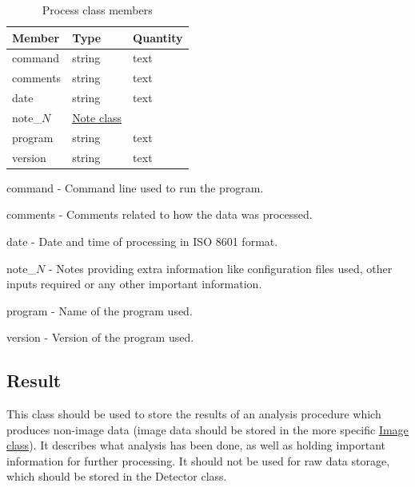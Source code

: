 \documentclass[usletter,11pt]{article}
\newcommand{\member}[2]
{ \noindent
{ \color{softBlue}  #1 - } #2
\vspace{0.2cm}
}
\begin{document}
\begin{table}[h!]\sffamily \footnotesize
\caption{Process class members}

\begin{tabular}{p{4.5cm} p{4.5cm}  p{2.5cm} }
\toprule
\bfseries Member     & \bfseries Type & \bfseries Quantity \\
\midrule
command & string & text \\
comments & string & text \\
date & string & text \\
note\_$N$ &  \hyperref[table:note]{Note class} & \\
program & string & text \\
version & string & text \\
\bottomrule
\end{tabular}
\end{table}

\member{command}{Command line used to run the program.}

\member{comments}{Comments related to how the data was processed.}

\member{date}{Date and time of processing in ISO 8601 format.}

\member{note\_$N$}{Notes providing extra information like
  configuration files used, other inputs required or any other
  important information.}

\member{program}{Name of the program used.}

\member{version}{Version of the program used.}

\subsection{Result}
\label{table:result}

This class should be used to store the results of an analysis procedure which
produces non-image data (image data should be stored in the more specific
\hyperref[table:image]{Image class}). It describes what analysis has been done,
as well as holding important information for further processing. It should not
be used for raw data storage, which should be stored in the Detector class.
\end{document}
